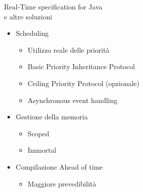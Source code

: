 \begin{frame}{Real-Time specification for Java \\e altre soluzioni}
	\begin{itemize}
		\item Scheduling
		\begin{itemize}
			\item Utilizzo reale delle priorità
			\item Basic Priority Inheritance Protocol
			\item Ceiling Priority Protocol (opzionale)
			\item Asynchronous event handling
		\end{itemize}
		\item Gestione della memoria
		\begin{itemize}
			\item Scoped
			\item Immortal
		\end{itemize}
		\item Compilazione Ahead of time
		\begin{itemize}
			\item Maggiore prevedibilità
		\end{itemize}
	\end{itemize}
\end{frame}